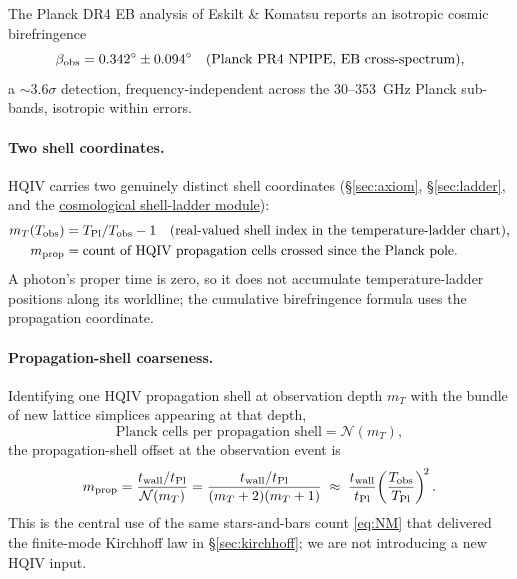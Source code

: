 \documentclass[11pt]{amsart}
\begin{document}
The Planck DR4 EB analysis of Eskilt \& Komatsu \cite{eskilt2022}
reports an isotropic cosmic birefringence
\begin{equation}\label{eq:pr4}
  \beta_{\rm obs}=0.342^\circ\pm 0.094^\circ
  \quad (\text{Planck PR4 NPIPE, EB cross-spectrum}),
\end{equation}
a $\sim3.6\sigma$ detection, frequency-independent across the
30--353~GHz Planck sub-bands, isotropic within errors.

\paragraph{Two shell coordinates.}  HQIV carries two genuinely
distinct shell coordinates (\S\ref{sec:axiom},
\S\ref{sec:ladder}, and the
\hyperref[lean:cosm-shell-ladder]{cosmological shell-ladder
module}):
\begin{align}
  m_{T}(T_{\rm obs}) &= T_{\rm Pl}/T_{\rm obs}-1
   \quad\text{(real-valued shell index in the temperature-ladder chart),}\\
  m_{\rm prop} &= \text{count of HQIV propagation cells crossed since the Planck pole.}
\end{align}
A photon's proper time is zero, so it does not accumulate
temperature-ladder positions along its worldline; the cumulative
birefringence formula uses the propagation coordinate.

\paragraph{Propagation-shell coarseness.}  Identifying one HQIV
propagation shell at observation depth $m_T$ with the bundle of
new lattice simplices appearing at that depth,
\begin{equation}\label{eq:bundle}
  \text{Planck cells per propagation shell}=\mathcal{N}(m_T),
\end{equation}
the propagation-shell offset at the observation event is
\begin{equation}\label{eq:mprop}
  m_{\rm prop}=\frac{t_{\rm wall}/t_{\rm Pl}}{\mathcal{N}(m_T)}
              =\frac{t_{\rm wall}/t_{\rm Pl}}{(m_T+2)(m_T+1)}
              \;\approx\;
              \frac{t_{\rm wall}}{t_{\rm Pl}}
              \!\left(\frac{T_{\rm obs}}{T_{\rm Pl}}\right)^{\!2}.
\end{equation}
This is the central use of the same stars-and-bars count
\eqref{eq:NM} that delivered the finite-mode Kirchhoff law in
\S\ref{sec:kirchhoff}; we are not introducing a new HQIV input.
\end{document}
